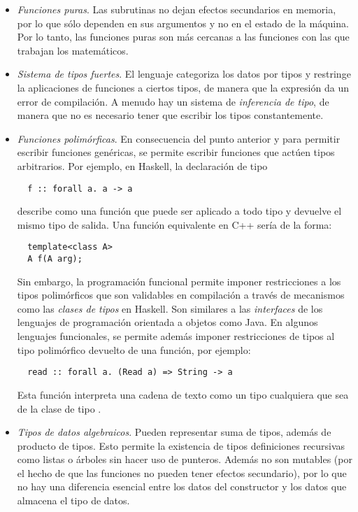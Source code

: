 \begin{itemize}
  \item \emph{Funciones puras}. Las subrutinas no dejan efectos secundarios en memoria, por lo que sólo dependen en sus argumentos y no en el estado de la máquina.
  Por lo tanto, las funciones puras son más cercanas a las funciones con las que trabajan los matemáticos.
  \item \emph{Sistema de tipos fuertes}. El lenguaje categoriza los datos por tipos y restringe la aplicaciones de funciones a ciertos tipos, de manera que la expresión  da un error de compilación.
  A menudo hay un sistema de \emph{inferencia de tipo}, de manera que no es necesario tener que escribir los tipos constantemente.
  \item \emph{Funciones polimórficas}. En consecuencia del punto anterior y para permitir escribir funciones genéricas, se permite escribir funciones que actúen tipos arbitrarios. Por ejemplo, en Haskell, la declaración de tipo
  \begin{verbatim}
  f :: forall a. a -> a
  \end{verbatim}
  describe  como una función que puede ser aplicado a todo tipo y devuelve el mismo tipo de salida.
  Una función equivalente en C++ sería de la forma:
  \begin{verbatim}
  template<class A>
  A f(A arg);
  \end{verbatim}
  Sin embargo, la programación funcional permite imponer restricciones a los tipos polimórficos que son validables en compilación a través de mecanismos como las \emph{clases de tipos} en Haskell.
  Son similares a las \emph{interfaces} de los lenguajes de programación orientada a objetos como Java.
  En algunos lenguajes funcionales, se permite además imponer restricciones de tipos al tipo polimórfico devuelto de una función, por ejemplo:
  \begin{verbatim}
  read :: forall a. (Read a) => String -> a
  \end{verbatim}
  Esta función interpreta una cadena de texto como un tipo cualquiera  que sea de la clase de tipo .
  \item \emph{Tipos de datos algebraicos}. Pueden representar suma de tipos, además de producto de tipos.
  Esto permite la existencia de tipos definiciones recursivas como listas o árboles sin hacer uso de punteros.
  Además no son mutables (por el hecho de que las funciones no pueden tener efectos secundario), por lo que no hay una diferencia esencial entre los datos del constructor y los datos que almacena el tipo de datos.


\end{itemize}
